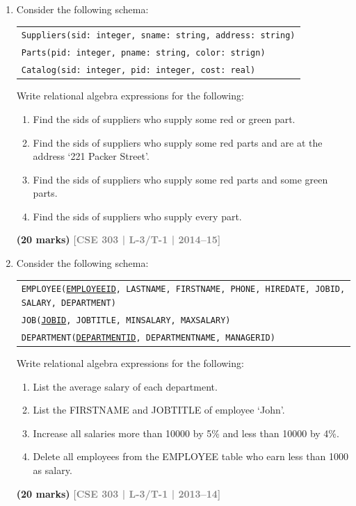 \documentclass[12pt]{article}
\newcommand{\yr}[1]{\hfill\textcolor{gray}{\small\textbf{[#1]}}}
\newcommand{\mk}[1]{\textcolor{orange!70!black}{\small\textbf{(#1 marks)}}}
\begin{document}
\begin{enumerate}
\begin{center}
\begin{tabular}{cl}
\end{tabular}
\end{center}

\mk{15} \yr{CSE 303 | L-3/T-1 | 2015--16}


\item Consider the following schema:
\begin{center}
\begin{tabular}{l}
\texttt{Suppliers(sid: integer, sname: string, address: string)}\\
\texttt{Parts(pid: integer, pname: string, color: strign)}\\
\texttt{Catalog(sid: integer, pid: integer, cost: real)}
\end{tabular}
\end{center}
Write relational algebra expressions for the following:
\begin{enumerate}
  \item Find the sids of suppliers who supply some red or green part.
  \item Find the sids of suppliers who supply some red parts and are at the address `221 Packer Street'.
  \item Find the sids of suppliers who supply some red parts and some green parts.
  \item Find the sids of suppliers who supply every part.
\end{enumerate}
\mk{20} \yr{CSE 303 | L-3/T-1 | 2014--15}


\item Consider the following schema:
\begin{center}
\begin{tabular}{l}
\texttt{EMPLOYEE(\underline{EMPLOYEEID}, LASTNAME, FIRSTNAME, PHONE, HIREDATE, JOBID, SALARY, DEPARTMENT)}\\
\texttt{JOB(\underline{JOBID}, JOBTITLE, MINSALARY, MAXSALARY)}\\
\texttt{DEPARTMENT(\underline{DEPARTMENTID}, DEPARTMENTNAME, MANAGERID)}
\end{tabular}
\end{center}
Write relational algebra expressions for the following:
\begin{enumerate}
  \item List the average salary of each department.
  \item List the FIRSTNAME and JOBTITLE of employee `John'.
  \item Increase all salaries more than 10000 by 5\% and less than 10000 by 4\%.
  \item Delete all employees from the EMPLOYEE table who earn less than 1000 as salary.
\end{enumerate}
\mk{20} \yr{CSE 303 | L-3/T-1 | 2013--14}



\end{enumerate}
\end{document}
